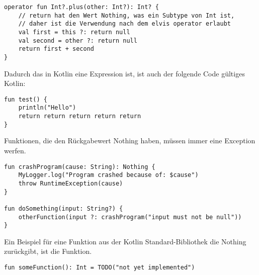\begin{verbatim}
operator fun Int?.plus(other: Int?): Int? {
    // return hat den Wert Nothing, was ein Subtype von Int ist,
    // daher ist die Verwendung nach dem elvis operator erlaubt
    val first = this ?: return null
    val second = other ?: return null
    return first + second
}
\end{verbatim}

Dadurch das  in Kotlin eine Expression ist, ist auch der folgende Code gültiges Kotlin:

\begin{verbatim}
fun test() {
    println("Hello")
    return return return return return
}
\end{verbatim}

Funktionen, die den Rückgabewert Nothing haben, müssen immer eine Exception werfen.

\begin{verbatim}
fun crashProgram(cause: String): Nothing {
    MyLogger.log("Program crashed because of: $cause")
    throw RuntimeException(cause)
}

fun doSomething(input: String?) {
    otherFunction(input ?: crashProgram("input must not be null"))
}
\end{verbatim}

Ein Beispiel für eine Funktion aus der Kotlin Standard-Bibliothek die Nothing zurückgibt, ist die
 Funktion.

\begin{verbatim}
fun someFunction(): Int = TODO("not yet implemented")
\end{verbatim}

\renewcommand{\kapitelautor}{}
